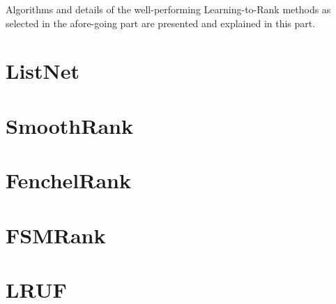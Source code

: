 Algorithms and details of the well-performing Learning-to-Rank methods as selected in the afore-going part are presented and explained in this part.

\section{ListNet}

\section{SmoothRank}

\section{FenchelRank}

\section{FSMRank}

\section{LRUF}